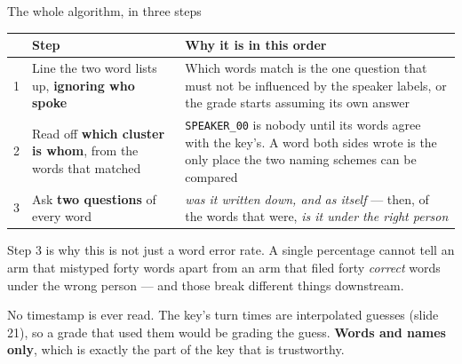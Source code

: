 \documentclass[aspectratio=169]{beamer}
\newcommand{\keybox}[1]{%
  \par\vspace{4pt}\begingroup\centering
  \colorbox{warmbg}{\parbox{0.93\textwidth}{\centering #1}}%
  \par\endgroup\vspace{2pt}}
\newenvironment{nicetable}[1]
  {\par\vspace{2pt}\begingroup\centering\small
   \renewcommand{\arraystretch}{1.18}%
   \setlength{\tabcolsep}{6pt}\rowcolors{2}{band}{white}%
   \begin{tabular}{#1}\arrayrulecolor{hdr}\toprule}
  {\bottomrule\end{tabular}\par\endgroup\vspace{2pt}}
\newcommand{\hd}[1]{\textcolor{hdr}{\textbf{#1}}}
\begin{document}
\begin{frame}{The whole algorithm, in three steps}

\begin{nicetable}{p{0.5cm}p{4.0cm}p{7.6cm}}
\hd{} & \hd{Step} & \hd{Why it is in this order} \\ \midrule
1 & Line the two word lists up, \textbf{ignoring who spoke}
  & Which words match is the one question that must not be influenced by the speaker
    labels, or the grade starts assuming its own answer \\
2 & Read off \textbf{which cluster is whom}, from the words that matched
  & \texttt{SPEAKER\_00} is nobody until its words agree with the key's. A word both sides
    wrote is the only place the two naming schemes can be compared \\
3 & Ask \textbf{two questions} of every word
  & \emph{was it written down, and as itself} --- then, of the words that were,
    \emph{is it under the right person} \\
\end{nicetable}

\vspace{0.1em}
{\small Step 3 is why this is not just a word error rate. A single percentage cannot tell
an arm that mistyped forty words apart from an arm that filed forty \emph{correct} words
under the wrong person --- and those break different things downstream.}

\keybox{No timestamp is ever read. The key's turn times are interpolated guesses
(slide 21), so a grade that used them would be grading the guess. \textbf{Words and names
only}, which is exactly the part of the key that is trustworthy.}

\end{frame}
\end{document}
